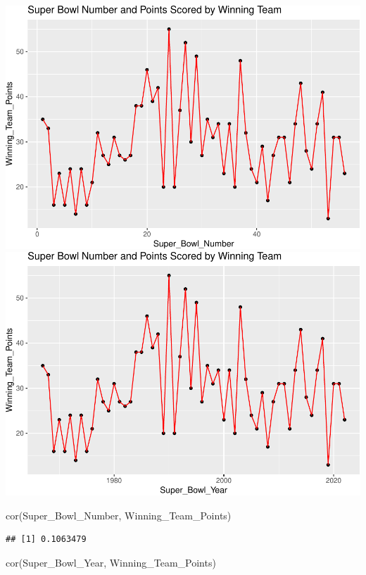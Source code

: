 \documentclass[
  11pt,
]{book}
\newenvironment{Shaded}{\begin{snugshade}}{\end{snugshade}}
\newcommand{\FunctionTok}[1]{\textcolor[rgb]{0.00,0.00,0.00}{#1}}
\newcommand{\NormalTok}[1]{#1}
\theoremstyle{definition}
\theoremstyle{definition}
\theoremstyle{definition}
\theoremstyle{definition}
\theoremstyle{remark}
\begin{document}
\includegraphics{series_files/figure-latex/correlation properties 2-1.pdf} \includegraphics{series_files/figure-latex/correlation properties 2-2.pdf}

\begin{Shaded}
\begin{Highlighting}[]
\FunctionTok{cor}\NormalTok{(Super\_Bowl\_Number, Winning\_Team\_Points)}
\end{Highlighting}
\end{Shaded}

\begin{verbatim}
## [1] 0.1063479
\end{verbatim}

\begin{Shaded}
\begin{Highlighting}[]
\FunctionTok{cor}\NormalTok{(Super\_Bowl\_Year, Winning\_Team\_Points)}
\end{Highlighting}
\end{Shaded}
\end{document}
